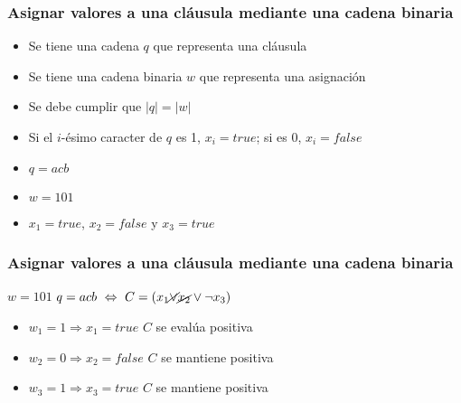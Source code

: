 \documentclass{beamer}
\begin{document}
\begin{frame}
    \frametitle{Asignar valores a una cláusula mediante una cadena binaria}
    
    \begin{itemize}
        \item<1-> Se tiene una cadena $q$ que representa una cláusula
        \item<2-> Se tiene una cadena binaria $w$ que representa una asignación
        \item<3-> Se debe cumplir que $|q|=|w|$
        \item<4-> Si el $i$-ésimo caracter de $q$ es 1, $x_i=true$; si es 0, $x_i=false$
            \vspace{0.5cm}
        \item<1-> $q=acb$
        \item<2-> $w=101$
        \item<4-> $x_1=true$, $x_2=false$ y $x_3=true$
    \end{itemize}
    
\end{frame}

\begin{frame}
    \frametitle{Asignar valores a una cláusula mediante una cadena binaria}
    
    \begin{center}
        \begin{Large}
            $w=101$ \hspace{1cm} $q=acb\ \Leftrightarrow\ C=({x_1}\cancel{\vee} \cancel{x_2}\vee \neg {x_3})$
        \end{Large}
    \end{center}
    
    \pause
    \vspace{1cm}
    
    \begin{itemize}
        \item $w_1=1\Rightarrow x_1=true$ $C$ se evalúa positiva
              \pause
        \item $w_2=0\Rightarrow x_2=false$ $C$ se mantiene positiva
              \pause
        \item $w_3=1\Rightarrow x_3=true$ $C$ se mantiene positiva
              
    \end{itemize}
\end{frame}
\end{document}
